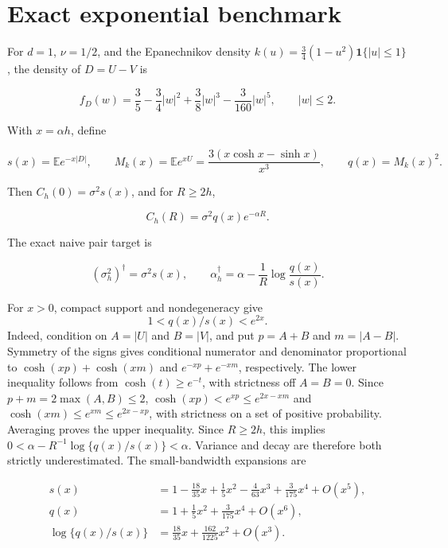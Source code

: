 \documentclass[11pt]{article}
\theoremstyle{remark}
\newcommand{\E}{\mathbb E}
\begin{document}
\section{Exact exponential benchmark}

For \(d=1\), \(\nu=1/2\), and the Epanechnikov density
\(k(u)=\tfrac34(1-u^2)\mathbf 1\{|u|\leq1\}\), the density of \(D=U-V\) is

\begin{equation}
  f_D(w)=\frac35-\frac34|w|^2+\frac38|w|^3-\frac{3}{160}|w|^5,
  \qquad |w|\leq2.
\end{equation}

With \(x=\alpha h\), define

\begin{equation}
  s(x)=\E e^{-x|D|},\qquad
  M_k(x)=\E e^{xU}=\frac{3(x\cosh x-\sinh x)}{x^3},\qquad
  q(x)=M_k(x)^2.
\end{equation}

Then \(C_h(0)=\sigma^2 s(x)\), and for \(R\geq2h\),

\begin{equation}
  C_h(R)=\sigma^2q(x)e^{-\alpha R}.
\end{equation}

The exact naive pair target is

\begin{equation}
  (\sigma_h^2)^\dagger=\sigma^2s(x),\qquad
  \alpha_h^\dagger
  =\alpha-\frac1R\log\frac{q(x)}{s(x)}.
\end{equation}

For \(x>0\), compact support and nondegeneracy give
\[
  1<q(x)/s(x)<e^{2x}.
\]
Indeed, condition on \(A=|U|\) and \(B=|V|\), and put
\(p=A+B\) and \(m=|A-B|\).  Symmetry of the signs gives conditional
numerator and denominator proportional to
\(\cosh(xp)+\cosh(xm)\) and \(e^{-xp}+e^{-xm}\), respectively.
The lower inequality follows from \(\cosh(t)\geq e^{-t}\), with strictness
off \(A=B=0\).  Since \(p+m=2\max(A,B)\leq2\),
\(\cosh(xp)<e^{xp}\leq e^{2x-xm}\) and
\(\cosh(xm)\leq e^{xm}\leq e^{2x-xp}\), with strictness on a set of
positive probability.  Averaging proves the upper inequality.
Since \(R\geq2h\), this implies
\(0<\alpha-R^{-1}\log\{q(x)/s(x)\}<\alpha\).  Variance and decay are
therefore both strictly underestimated.  The small-bandwidth expansions are

\begin{align}
  s(x)&=1-\frac{18}{35}x+\frac15x^2-\frac4{63}x^3
        +\frac3{175}x^4+O(x^5),\\
  q(x)&=1+\frac15x^2+\frac3{175}x^4+O(x^6),\\
  \log\{q(x)/s(x)\}&=\frac{18}{35}x+\frac{162}{1225}x^2+O(x^3).
\end{align}
\end{document}

